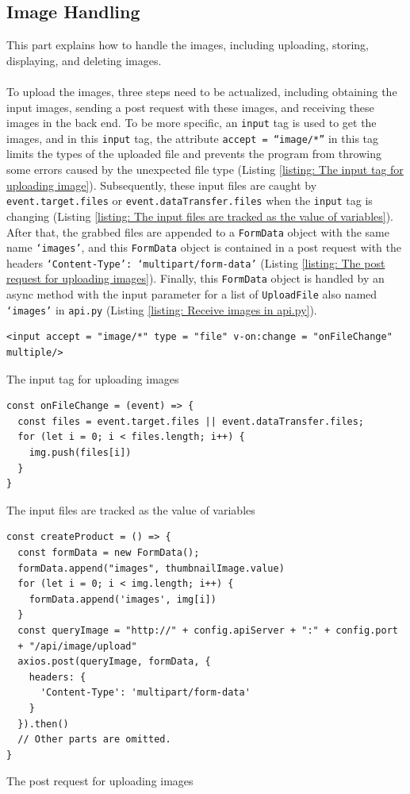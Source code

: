 \documentclass{article}
\begin{document}
\subsection{Image Handling}
This part explains how to handle the images, including uploading, storing, displaying, and deleting images. 
\\\\
To upload the images, three steps need to be actualized, including obtaining the input images, sending a post request with these images, and receiving these images in the back end. To be more specific, an \verb|input| tag is used to get the images, and in this \verb|input| tag, the attribute \verb|accept = “image/*”| in this tag limits the types of the uploaded file and prevents the program from throwing some errors caused by the unexpected file type (Listing \ref{listing: The input tag for uploading image}). Subsequently, these input files are caught by \verb|event.target.files| or \verb|event.dataTransfer.files| when the \verb|input| tag is changing (Listing \ref{listing: The input files are tracked as the value of variables}). After that, the grabbed files are appended to a \verb|FormData| object with the same name \verb|‘images’|, and this \verb|FormData| object is contained in a post request with the headers \verb|‘Content-Type’: ‘multipart/form-data’| (Listing \ref{listing: The post request for uploading images}). Finally, this \verb|FormData| object is handled by an async method with the input parameter for a list of \verb|UploadFile| also named \verb|‘images’| in \verb|api.py| (Listing \ref{listing: Receive images in api.py}).
\begin{listing}[!htp]
\begin{verbatim}
<input accept = "image/*" type = "file" v-on:change = "onFileChange" multiple/>
\end{verbatim}
\caption{The input tag for uploading images}
\label{listing: The input tag for uploading image}
\end{listing}
\begin{listing}[!htp]
\begin{verbatim}
const onFileChange = (event) => {
  const files = event.target.files || event.dataTransfer.files;
  for (let i = 0; i < files.length; i++) {
    img.push(files[i])
  }
}
\end{verbatim}
\caption{The input files are tracked as the value of variables}
\label{listing: The input files are tracked as the value of variables}
\end{listing}
\begin{listing}[!htp]
\begin{verbatim}
const createProduct = () => {
  const formData = new FormData();
  formData.append("images", thumbnailImage.value)
  for (let i = 0; i < img.length; i++) {
    formData.append('images', img[i])
  }
  const queryImage = "http://" + config.apiServer + ":" + config.port 
  + "/api/image/upload"
  axios.post(queryImage, formData, {
    headers: {
      'Content-Type': 'multipart/form-data'
    }
  }).then()
  // Other parts are omitted.
}
\end{verbatim}
\caption{The post request for uploading images}
\label{listing: The post request for uploading images}
\end{listing}
\end{document}
